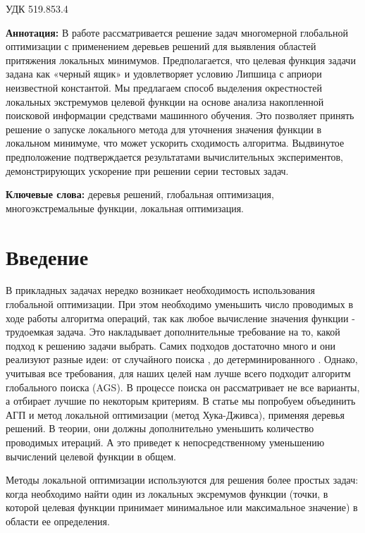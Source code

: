 \documentclass[12pt, a4paper, russian]{article}
\begin{document}
УДК 519.853.4

\vspace{\baselineskip}

\begin{small}
\textbf{Аннотация:} В работе рассматривается решение задач многомерной глобальной оптимизации с применением деревьев решений для выявления областей притяжения локальных минимумов. Предполагается, что целевая функция задачи задана как «черный ящик» и удовлетворяет условию Липшица с априори неизвестной константой. Мы предлагаем способ выделения окрестностей локальных экстремумов целевой функции на основе анализа накопленной поисковой информации средствами машинного обучения. Это позволяет принять решение о запуске локального метода для уточнения значения функции в локальном минимуме, что может ускорить сходимость алгоритма. Выдвинутое предположение подтверждается результатами вычислительных экспериментов, демонстрирующих ускорение при решении серии тестовых задач.

\textbf{Ключевые слова:} деревья решений, глобальная оптимизация, многоэкстремальные функции, локальная оптимизация.
\end{small}


\section{Введение}

В прикладных задачах нередко возникает необходимость использования глобальной оптимизации. При этом необходимо уменьшить число проводимых в ходе работы алгоритма операций, так как любое вычисление значения функции - трудоемкая задача. Это накладывает дополнительные требование на то, какой подход к решению задачи выбрать. Самих подходов достаточно много и они реализуют разные идеи: от случайного поиска \cite{fio_bib1, fio_bib2, fio_bib3}, до детерминированного \cite{fio_bib4, fio_bib5, fio_bib6}. Однако, учитывая все требования, для наших целей нам лучше всего подходит алгоритм глобального поиска (AGS). В процессе поиска он рассматривает не все варианты, а отбирает лучшие по некоторым критериям. В статье мы попробуем объединить АГП и метод локальной оптимизации (метод Хука-Дживса), применяя деревья решений. В теории, они должны дополнительно уменьшить количество проводимых итераций. А это приведет к непосредственному уменьшению вычислений целевой функции в общем.

Методы локальной оптимизации используются для решения более простых задач: когда необходимо найти один из локальных эксремумов функции (точки, в которой целевая функции принимает минимальное или максимальное значение) в области ее определения.
\end{document}
